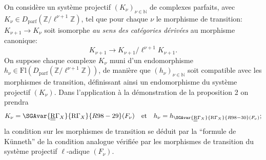 On considère un système projectif $(K_\nu)_{\nu\in\mathbb{N}}$ de complexes parfaits, avec $K_\nu\in D_{\mathrm{parf}}(\mathbb{Z}/\ell^{\nu+1}\mathbb{Z})$, tel que pour chaque $\nu$ le
morphisme de transition: $K_{\nu+1}\to K_\nu$ soit isomorphe \emph{au sens des catégories dérivées} au morphisme canonique:
\[
K_{\nu+1}\to K_{\nu+1}/\ell^{\nu+1}K_{\nu+1}.
\]
On suppose chaque complexe $K_\nu$ muni d'un endomorphisme $h_\nu\in\mathrm{Fl}(D_{\mathrm{parf}}(\mathbb{Z}/\ell^{\nu+1}\mathbb{Z}))$, de manière que $(h_\nu)_{\nu\in\mathbb{N}}$ soit compatible avec les morphismes de transition, définissant ainsi un endomorphisme du système projectif $(K_\nu)$. Dans l'application à la démonstration de la proposition 2 on prendra
\[
K_\nu=\SGAvar{\underline{\underline{\mathrm{R}}}\Gamma_X}{\mathrm{R}\Gamma_X}{R98-29}(F_\nu)\quad\text{et}\quad h_\nu=h_{\SGAvar{\underline{\underline{\mathrm{R}}}\Gamma_X}{\mathrm{R}\Gamma_X}{R98-30}(F_\nu)};
\]
la condition sur les morphismes de transition se déduit par la ``formule de Künneth'' de la condition analogue vérifiée par les morphismes de transition du système projectif $\ell$-adique $(F_\nu)$.

